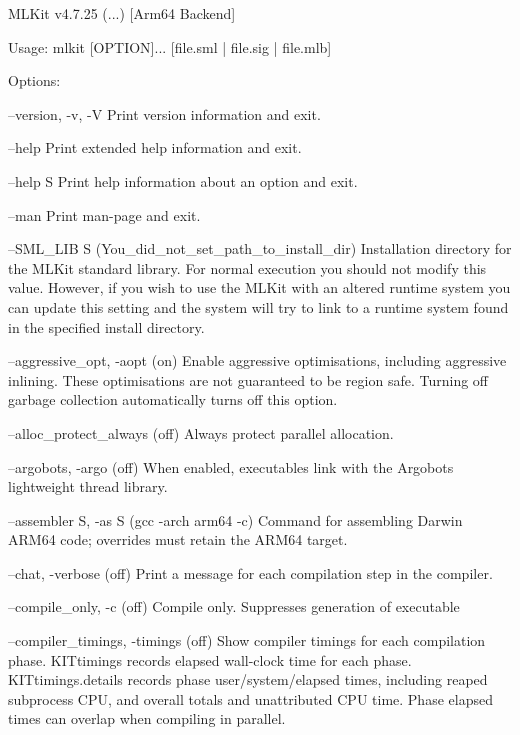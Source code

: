 \documentclass[12pt]{book}
\begin{document}
\begin{scriptcode}
MLKit v4.7.25 (...) [Arm64 Backend]

Usage: mlkit [OPTION]... [file.sml | file.sig | file.mlb]

Options:

--version, -v, -V
     Print version information and exit.

--help
     Print extended help information and exit.

--help S
     Print help information about an option and exit.

--man
     Print man-page and exit.

--SML_LIB S              (You_did_not_set_path_to_install_dir)
     Installation directory for the MLKit standard library.
     For normal execution you should not modify this value.
     However, if you wish to use the MLKit with an altered
     runtime system you can update this setting and the
     system will try to link to a runtime system found in
     the specified install directory.

--aggressive_opt, -aopt                                   (on)
     Enable aggressive optimisations, including aggressive
     inlining. These optimisations are not guaranteed to be
     region safe. Turning off garbage collection automatically
     turns off this option.

--alloc_protect_always                                   (off)
     Always protect parallel allocation.

--argobots, -argo                                        (off)
     When enabled, executables link with the Argobots
     lightweight thread library.

--assembler S, -as S                      (gcc -arch arm64 -c)
     Command for assembling Darwin ARM64 code; overrides
     must retain the ARM64 target.

--chat, -verbose                                         (off)
     Print a message for each compilation step in the compiler.

--compile_only, -c                                       (off)
     Compile only. Suppresses generation of executable

--compiler_timings, -timings                             (off)
     Show compiler timings for each compilation phase.
     KITtimings records elapsed wall-clock time for each phase.
     KITtimings.details records phase user/system/elapsed times, including
     reaped subprocess CPU, and overall totals and unattributed CPU time.
     Phase elapsed times can overlap when compiling in parallel.


\end{scriptcode}
\end{document}
